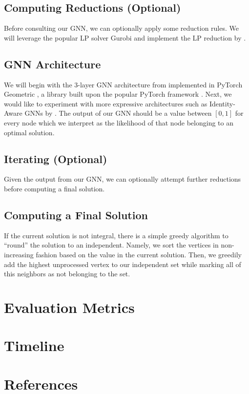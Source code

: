 \documentclass{article}
\begin{document}
\subsection{Computing Reductions (Optional)}
Before consulting our GNN,
we can optionally apply some reduction rules.
We will leverage the popular LP solver Gurobi \citet{gurobi}
and implement the LP reduction by \citet{lpreduction}.

\subsection{GNN Architecture}
We will begin with the 3-layer GNN architecture from \citet{langedal_et_al}
implemented in PyTorch Geometric \citet{pyg},
a library built upon the popular PyTorch framework \citet{pytorch}.
Next, we would like to experiment with more expressive architectures
such as Identity-Aware GNNs by \citet{idgnn}.
The output of our GNN should be a value between $[0, 1]$ for every node
which we interpret as the likelihood of that node belonging to an optimal solution.

\subsection{Iterating (Optional)}
Given the output from our GNN,
we can optionally attempt further reductions before computing a final solution.

\subsection{Computing a Final Solution}
If the current solution is not integral,
there is a simple greedy algorithm to ``round'' the solution to an independent.
Namely, we sort the vertices in non-increasing fashion based on the value in the current solution.
Then, we greedily add the highest unprocessed vertex to our independent set
while marking all of this neighbors as not belonging to the set.

\section{Evaluation Metrics}
\section{Timeline}
\section{References}


\end{document}

